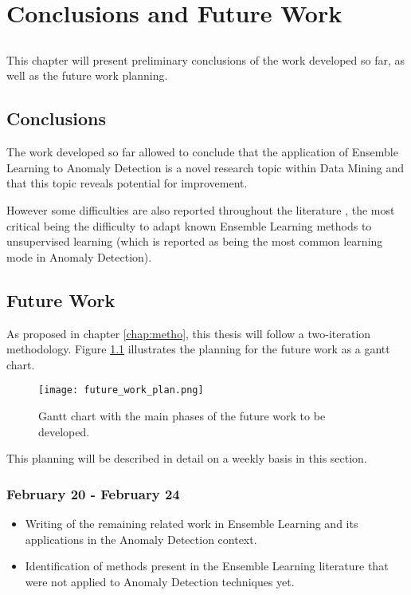 \chapter{Conclusions and Future Work} \label{chap:conc}

\section*{}

This chapter will present preliminary conclusions of the work developed so far, as well as the future work planning.

\section{Conclusions}

The work developed so far allowed to conclude that the application of Ensemble Learning to Anomaly Detection is a novel research topic within Data Mining and that this topic reveals potential for improvement. 

However some difficulties are also reported throughout the literature \cite{Aggarwal2013, Zimek2014}, the most critical being the difficulty to adapt known Ensemble Learning methods to unsupervised learning (which is reported as being the most common learning mode in Anomaly Detection).

\section{Future Work}

As proposed in chapter \ref{chap:metho}, this thesis will follow a two-iteration methodology. Figure \ref{fig:gantt} illustrates the planning for the future work as a gantt chart.

\begin{figure}[!ht]
	\centering
	\texttt{[image: future\_work\_plan.png]}
	\caption{Gantt chart with the main phases of the future work to be developed.}
	\label{fig:gantt}
\end{figure}

This planning will be described in detail on a weekly basis in this section.

\subsection{February 20 - February 24}

\begin{itemize}
	\item Writing of the remaining related work in Ensemble Learning and its applications in the Anomaly Detection context.
	\item Identification of methods present in the Ensemble Learning literature that were not applied to Anomaly Detection techniques yet.
\end{itemize}

